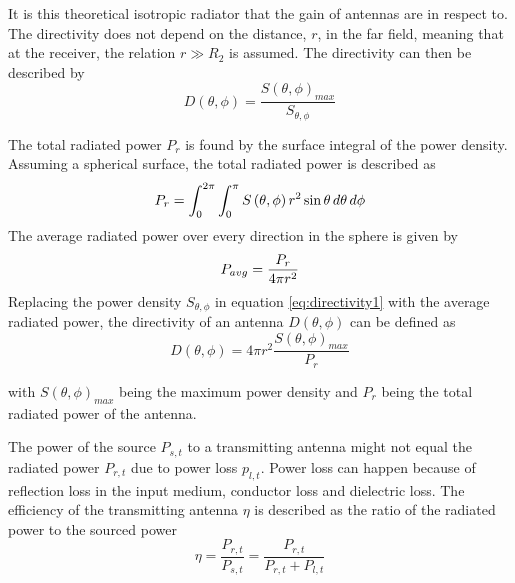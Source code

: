 It is this theoretical isotropic radiator that the gain of antennas are in respect to. The directivity does not depend on the distance, $r$, in the far field, meaning that at the receiver, the relation $r \gg  R_2$ is assumed. The directivity can then be described by~\cite[p. 10]{ant_beam_form}
\begin{equation} \label{eq:directivity1}
    D \left( \theta, \phi \right) = \frac{S \left( \theta, \phi \right)_{max}}{S_{\theta, \phi}}
\end{equation}

The total radiated power $P_{r}$ is found by the surface integral of the power density. Assuming a spherical surface, the total radiated power is described as~\cite[p. 1-9]{ant_eng_hk}
\begin{equation} \label{eq:surface_integral}
    P_{r} = \int_{0}^{2 \pi} \int_{0}^{\pi} S\left( \theta, \phi \right) r^2 \sin \theta \, d\theta \, d\phi
    \tagaddtext{[\si{\watt}]}
\end{equation}
The average radiated power over every direction in the sphere is given by~\cite[p. 1-9]{ant_eng_hk}
\begin{equation} \label{eq:average_power}
    P_{avg} = \frac{P_{r}}{4 \pi r^2}
    \tagaddtext{[\si{\watt\per\meter\squared}]}
\end{equation}
Replacing the power density $S_{ \theta, \phi }$ in equation \ref{eq:directivity1} with the average radiated power, the directivity of an antenna $D \left(\theta, \phi \right)$ can be defined as~\cite[p. 10]{ant_beam_form}
\begin{equation} \label{eq:directivity}
    D\left(\theta, \phi\right) = 4 \pi r^2 \frac{S \left(\theta, \phi\right)_{max}}{P_{r}}
\end{equation}

with $S\left(\theta, \phi\right)_{max}$ being the maximum power density and $P_{r}$ being the total radiated power of the antenna.

The power of the source $P_{s,t}$ to a transmitting antenna might not equal the radiated power $P_{r,t}$ due to power loss $p_{l,t}$. Power loss can happen because of reflection loss in the input medium, conductor loss and dielectric loss. The efficiency of the transmitting antenna $\eta$ is described as the ratio of the radiated power to the sourced power 
\begin{equation} \label{eq:antenna_efficiency}
    \eta = \frac{P_{r,t}}{P_{s,t}} = \frac{P_{r,t}}{P_{r,t}+P_{l,t}}
\end{equation}

